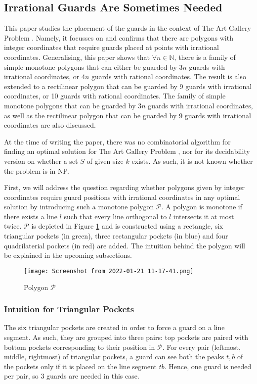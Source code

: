 \subsection{Irrational Guards Are Sometimes Needed \cite{abrahamsen2021art}}
This paper \cite{abrahamsen2021art} studies the placement of the guards in the context of The Art Gallery Problem \cite{o1987art}. Namely, it focusses on and confirms that there are polygons with integer coordinates that require guards placed at points with irrational coordinates. Generalising, this paper shows that $\forall n \in \mathbb N$, there is a family of simple monotone polygons that can either be guarded by $3n$ guards with irrational coordinates, or $4n$ guards with rational coordinates. The result is also extended to a rectilinear polygon that can be guarded by 9 guards with irrational coordinates, or 10 guards with rational coordinates. The family of simple monotone polygons that can be guarded by $3n$ guards with irrational coordinates, as well as the rectilinear polygon that can be guarded by 9 guards with irrational coordinates are also discussed.


At the time of writing the paper, there was no combinatorial algorithm for finding an optimal solution for The Art Gallery Problem \cite{o1987art}, nor for its decidability version on whether a set $S$ of given size $k$ exists. As such, it is not known whether the problem is in NP.

First, we will address the question regarding whether polygons given by integer coordinates require guard positions with irrational coordinates in any optimal solution by introducing such a monotone polygon $\mathcal P$. A polygon is monotone if there exists a line $l$ such that every line orthogonal to $l$ intersects it at most twice. $\mathcal P$ is depicted in Figure \ref{fig:p} and is constructed using a rectangle, six triangular pockets (in green), three rectangular pockets (in blue) and four quadrilaterial pockets (in red) are added. The intuition behind the polygon will be explained in the upcoming subsections.

\begin{figure}[h!]
    \centering
    \texttt{[image: Screenshot from 2022-01-21 11-17-41.png]}
    \caption{Polygon $\mathcal P$}
    \label{fig:p}
\end{figure}

\subsubsection{Intuition for Triangular Pockets}
The six triangular pockets are created in order to force a guard on a line segment. As such, they are grouped into three pairs: top pockets are paired with bottom pockets corresponding to their position in $\mathcal P$. For every pair (leftmost, middle, rightmost) of triangular pockets, a guard can see both the peaks $t, b$ of the pockets only if it is placed on the line segment $\overline{tb}$. Hence, one guard is needed per pair, so 3 guards are needed in this case.

